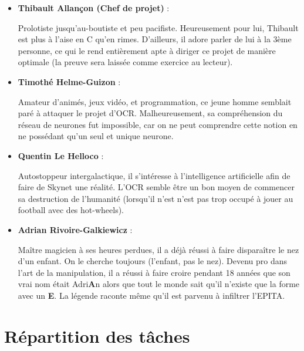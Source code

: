 \begin{itemize}
    \item \textbf{Thibault Allançon (Chef de projet)} :

        Prolotiste jusqu’au-boutiste et peu pacifiste. Heureusement pour lui,
        Thibault est plus à l'aise en C qu'en rimes. D'ailleurs, il adore parler
        de lui à la 3ème personne, ce qui le rend entièrement apte à diriger ce
        projet de manière optimale (la preuve sera laissée comme exercice au
        lecteur).

    \item \textbf{Timothé Helme-Guizon} :

        Amateur d'animés, jeux vidéo, et programmation, ce jeune homme semblait
        paré à attaquer le projet d'OCR. Malheureusement, sa compréhension du
        réseau de neurones fut impossible, car on ne peut comprendre cette
        notion en ne possédant qu'un seul et unique neurone.

    \item \textbf{Quentin Le Helloco} :

        Autostoppeur intergalactique, il s'intéresse à l'intelligence
        artificielle afin de faire de Skynet une réalité. L'OCR semble être un
        bon moyen de commencer sa destruction de l'humanité (lorsqu'il n’est
        n'est pas trop occupé à jouer au football avec des hot-wheels).

    \item \textbf{Adrian Rivoire-Galkiewicz} :

        Maître magicien à ses heures perdues, il a déjà réussi à faire
        disparaître le nez d’un enfant. On le cherche toujours (l'enfant, pas le
        nez). Devenu pro dans l’art de la manipulation, il a réussi à faire
        croire pendant 18 années que son vrai nom était Adri\textbf{A}n alors
        que tout le monde sait qu’il n’existe que la forme avec un \textbf{E}.
        La légende raconte même qu'il est parvenu à infiltrer l'EPITA.
\end{itemize}

\chapter{Répartition des tâches}

